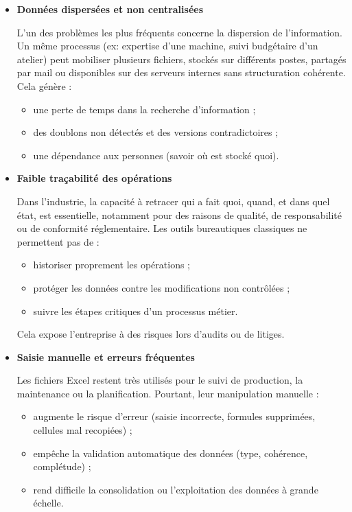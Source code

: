 \documentclass[11pt,a4paper]{article}
\begin{document}
\begin{itemize}
\item \textbf{Données dispersées et non centralisées}

L’un des problèmes les plus fréquents concerne la dispersion de l’information. Un même processus (ex: expertise d’une machine, suivi budgétaire d’un atelier) peut mobiliser plusieurs fichiers, stockés sur différents postes, partagés par mail ou disponibles sur des serveurs internes sans structuration cohérente. Cela génère :

\begin{itemize}
    \item une perte de temps dans la recherche d’information ;
    \item des doublons non détectés et des versions contradictoires ;
    \item une dépendance aux personnes (savoir où est stocké quoi).
\end{itemize}

\item \textbf{Faible traçabilité des opérations}

Dans l’industrie, la capacité à retracer qui a fait quoi, quand, et dans quel état, est essentielle, notamment pour des raisons de qualité, de responsabilité ou de conformité réglementaire. Les outils bureautiques classiques ne permettent pas de :

\begin{itemize}
    \item historiser proprement les opérations ;
    \item protéger les données contre les modifications non contrôlées ;
    \item suivre les étapes critiques d’un processus métier.
\end{itemize}

Cela expose l’entreprise à des risques lors d’audits ou de litiges.

\item \textbf{Saisie manuelle et erreurs fréquentes}

Les fichiers Excel restent très utilisés pour le suivi de production, la maintenance ou la planification. Pourtant, leur manipulation manuelle :

\begin{itemize}
    \item augmente le risque d’erreur (saisie incorrecte, formules supprimées, cellules mal recopiées) ;
    \item empêche la validation automatique des données (type, cohérence, complétude) ;
    \item rend difficile la consolidation ou l’exploitation des données à grande échelle.
\end{itemize}


\end{itemize}
\end{document}
